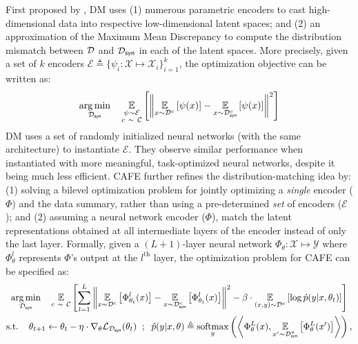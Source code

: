 \documentclass[10pt]{article} %
\begin{document}
First proposed by \citet{dm}, DM uses (1) numerous parametric encoders to cast high-dimensional data into respective low-dimensional latent spaces; and (2) an approximation of the Maximum Mean Discrepancy to compute the distribution mismatch between $\mathcal{D}$ and $\mathcal{D}_{\mathsf{syn}}$ in each of the latent spaces. More precisely, given a set of $k$ encoders $\mathcal{E} \triangleq \{ \psi_i : \mathcal{X} \mapsto \mathcal{X}_i \}_{i=1}^{k}$, the optimization objective can be written as:
\begin{equation} \label{eqn:distribution_matching}
\begin{gathered}
    \underset{\mathcal{D}_{\mathsf{syn}}}{\operatorname{arg} \operatorname{min}} \hspace{0.4cm} \underset{\substack{\psi \sim \mathcal{E}\\c ~\sim~ \mathcal{C}}}{\mathbb{E}} \left[\left\lVert \underset{x \sim \mathcal{D}^c}{\mathbb{E}} \left[\psi(x)\right] - \underset{x \sim \mathcal{D}_{\mathsf{syn}}^c}{\mathbb{E}} \left[\psi(x)\right] \right\rVert^2\right]
\end{gathered}
\end{equation}
DM uses a set of randomly initialized neural networks (with the same architecture) to instantiate $\mathcal{E}$. They observe similar performance when instantiated with more meaningful, task-optimized neural networks, despite it being much less efficient. CAFE \citep{cafe} further refines the distribution-matching idea by: (1) solving a bilevel optimization problem for jointly optimizing a \emph{single} encoder ($\Phi$) and the data summary, rather than using a pre-determined \emph{set} of encoders ($\mathcal{E}$); and (2) assuming a neural network encoder ($\Phi$), match the latent representations obtained at all intermediate layers of the encoder instead of only the last layer. Formally, given a $(L+1)$-layer neural network $\Phi_\theta : \mathcal{X} \mapsto \mathcal{Y}$ where $\Phi^l_{\theta}$ represents $\Phi$'s output at the $l^{\text{th}}$ layer, the optimization problem for CAFE can be specified as:
\begin{equation} \label{eqn:cafe_distribution_matching}
\begin{gathered}
    \underset{\mathcal{D}_{\mathsf{syn}}}{\operatorname{arg} \operatorname{min}} \hspace{0.4cm} \underset{c ~\sim~ \mathcal{C}}{\mathbb{E}} \left[\sum_{l=1}^{L} \left\lVert \underset{x \sim \mathcal{D}^c}{\mathbb{E}} \left[\Phi^l_{\theta_t}(x)\right] - \underset{x \sim \mathcal{D}_{\mathsf{syn}}^c}{\mathbb{E}} \left[\Phi^l_{\theta_t}(x)\right] \right\rVert^2  - \beta \cdot \underset{(x,y)\sim \mathcal{D}^c}{\mathbb{E}} \left[\log \hat{p}(y|x, \theta_t)\right]\right] \\
    \text{s.t.} \hspace{0.4cm} \theta_{t+1} \leftarrow \theta_t - \eta \cdot \nabla_\theta \mathcal{L}_{\mathcal{D}_{\mathsf{syn}}}(\theta_t) 
    \hspace{0.2cm} ; \hspace{0.2cm}
    \hat{p}(y|x, \theta) \triangleq \underset{y}{\operatorname{softmax}}\left(\left\langle \Phi^L_\theta(x), \underset{x' \sim \mathcal{D}_{\mathsf{syn}}^y}{\mathbb{E}} \left[\Phi^L_\theta(x')\right] \right\rangle\right),
\end{gathered}
\end{equation}
\end{document}
